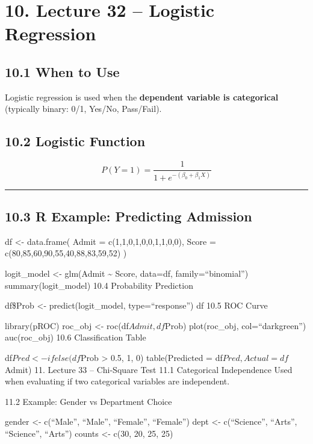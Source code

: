 \documentclass[
  letterpaper,
  DIV=11,
  numbers=noendperiod]{scrreprt}
\begin{document}

\chapter{10. Lecture 32 -- Logistic
Regression}\label{lecture-32-logistic-regression}

\section{10.1 When to Use}\label{when-to-use}

Logistic regression is used when the \textbf{dependent variable is
categorical} (typically binary: 0/1, Yes/No, Pass/Fail).

\section{10.2 Logistic Function}\label{logistic-function}

\[
P(Y=1) = \frac{1}{1 + e^{-(\beta_0 + \beta_1 X)}}
\]

\begin{center}\rule{0.5\linewidth}{0.5pt}\end{center}

\section{10.3 R Example: Predicting
Admission}\label{r-example-predicting-admission}

df \textless- data.frame( Admit = c(1,1,0,1,0,0,1,1,0,0), Score =
c(80,85,60,90,55,40,88,83,59,52) )

logit\_model \textless- glm(Admit \textasciitilde{} Score, data=df,
family=``binomial'') summary(logit\_model) 10.4 Probability Prediction

df\$Prob \textless- predict(logit\_model, type=``response'') df 10.5 ROC
Curve

library(pROC) roc\_obj \textless- roc(df\(Admit, df\)Prob)
plot(roc\_obj, col=``darkgreen'') auc(roc\_obj) 10.6 Classification
Table

df\(Pred <- ifelse(df\)Prob \textgreater{} 0.5, 1, 0) table(Predicted =
df\(Pred, Actual = df\)Admit) 11. Lecture 33 -- Chi-Square Test 11.1
Categorical Independence Used when evaluating if two categorical
variables are independent.

11.2 Example: Gender vs Department Choice

gender \textless- c(``Male'', ``Male'', ``Female'', ``Female'') dept
\textless- c(``Science'', ``Arts'', ``Science'', ``Arts'') counts
\textless- c(30, 20, 25, 25)
\end{document}
